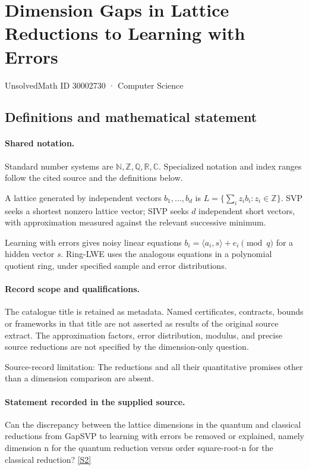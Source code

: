 \documentclass[11pt]{article}
\newcommand{\sref}[2]{\hyperlink{source:#1:#2}{[S#2]}}
\begin{document}
\setcounter{section}{30002729}
\section{Dimension Gaps in Lattice Reductions to Learning with Errors}\label{30002730}
{\small\sffamily UnsolvedMath ID 30002730 · Computer Science}
\subsection{Definitions and mathematical statement}

\paragraph{Shared notation.}Standard number systems are $\mathbb N,\mathbb Z,\mathbb Q,\mathbb R,\mathbb C$. Specialized notation and index ranges follow the cited source and the definitions below.


A lattice generated by independent vectors $b_1,\ldots,b_d$ is $L=\{\sum_i z_i b_i:z_i\in\mathbb Z\}$. SVP seeks a shortest nonzero lattice vector; SIVP seeks $d$ independent short vectors, with approximation measured against the relevant successive minimum.

Learning with errors gives noisy linear equations $b_i=\langle a_i,s\rangle+e_i\pmod q$ for a hidden vector $s$. Ring-LWE uses the analogous equations in a polynomial quotient ring, under specified sample and error distributions.
\paragraph{Record scope and qualifications.}
The catalogue title is retained as metadata. Named certificates, contracts, bounds or frameworks in that title are not asserted as results of the original source extract.
The approximation factors, error distribution, modulus, and precise source reductions are not specified by the dimension-only question.

Source-record limitation: The reductions and all their quantitative promises other than a dimension comparison are absent.
\paragraph{Statement recorded in the supplied source.}
Can the discrepancy between the lattice dimensions in the quantum and classical reductions from GapSVP to learning with errors be removed or explained, namely dimension n for the quantum reduction versus order square-root-n for the classical reduction? \sref{30002730}{2}
\end{document}
